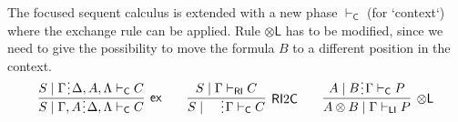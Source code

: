 \documentclass[submission,copyright,creativecommons]{eptcs}
\theoremstyle{definition}
\newcommand{\tl}{\otimes \mathsf{L}}
\newcommand{\tr}{\otimes \mathsf{R}}
\newcommand{\pass}{\mathsf{pass}}
\newcommand{\unitl}{\mathsf{IL}}
\newcommand{\unitr}{\mathsf{IR}}
\newcommand{\andlone}{\land \mathsf{L}_{1}}
\newcommand{\andltwo}{\land \mathsf{L}_{2}}
\newcommand{\andr}{\land \mathsf{R}}
\newcommand{\orl}{\lor \mathsf{L}}
\newcommand{\orrone}{\lor \mathsf{R}_{1}}
\newcommand{\orrtwo}{\lor \mathsf{R}_{2}}
\newcommand{\ax}{\mathsf{ax}}
\newcommand{\ot}{\otimes}
\newcommand{\I}{\mathsf{I}}
\newcommand{\C}{\mathsf{C}}
\newcommand{\RI}{\mathsf{RI}}
\newcommand{\LI}{\mathsf{LI}}
\newcommand{\F}{\mathsf{F}}
\newcommand{\tP}{\mathbb{P}}
\newcommand{\tL}{\mathbb{L}}
\newcommand{\tR}{\mathbb{R}}
\newcommand{\tE}{\mathbb{E}}
\newcommand{\ex}{\mathsf{ex}}
\newcommand{\spl}{\raisebox{-1.5pt}[0.5\height]{\hspace{1pt}\vdots\hspace{1pt}}}
\newcommand{\proofbox}[1]{\begin{tabular}{l} #1 \end{tabular}}
\begin{document}
The focused sequent calculus is extended with a new phase $\vdash_\C$ (for `context`) where the exchange rule can be applied. Rule $\tl$ has to be modified, since we need to give the possibility to move the formula $B$ to a different position in the context.
\begin{equation*}\label{eq:focus:sym}
  \begin{array}{c}
      \infer[\ex]{S \mid \Gamma , A \spl \Delta , \Lambda \vdash_{\C} C}{S \mid \Gamma \spl \Delta , A , \Lambda \vdash_{\C} C}
      \qquad
      \infer[\RI 2 \C]{S \mid \quad \spl \Gamma \vdash_{\C} C}{S \mid \Gamma \vdash_{\RI} C}
    \qquad
    \infer[\tl]{A \ot B \mid \Gamma \vdash_{\LI} P}{A \mid B \spl \Gamma \vdash_{\C} P}
  \end{array}
\end{equation*}
\end{document}
